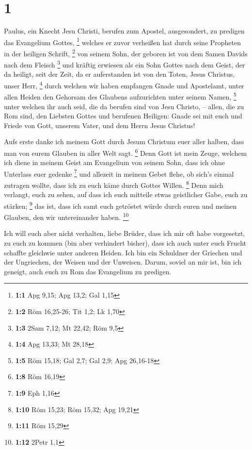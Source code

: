 \hypertarget{section}{%
\section{1}\label{section}}

 Paulus, ein Knecht Jesu Christi, berufen zum Apostel,
ausgesondert, zu predigen das Evangelium Gottes, \footnote{\textbf{1:1}
  Apg 9,15; Apg 13,2; Gal 1,15}  welches er zuvor verheißen
hat durch seine Propheten in der heiligen Schrift, \footnote{\textbf{1:2}
  Röm 16,25-26; Tit 1,2; Lk 1,70}  von seinem Sohn, der
geboren ist von dem Samen Davids nach dem Fleisch \footnote{\textbf{1:3}
  2Sam 7,12; Mt 22,42; Röm 9,5}  und kräftig erwiesen als
ein Sohn Gottes nach dem Geist, der da heiligt, seit der Zeit, da er
auferstanden ist von den Toten, Jesus Christus, unser Herr, \footnote{\textbf{1:4}
  Apg 13,33; Mt 28,18}  durch welchen wir haben empfangen
Gnade und Apostelamt, unter allen Heiden den Gehorsam des Glaubens
aufzurichten unter seinem Namen, \footnote{\textbf{1:5} Röm 15,18; Gal
  2,7; Gal 2,9; Apg 26,16-18}  unter welchen ihr auch seid,
die da berufen sind von Jesu Christo, --  allen, die zu Rom
sind, den Liebsten Gottes und berufenen Heiligen: Gnade sei mit euch und
Friede von Gott, unserem Vater, und dem Herrn Jesus Christus!

 Aufs erste danke ich meinem Gott durch Jesum Christum euer
aller halben, dass man von eurem Glauben in aller Welt sagt. \footnote{\textbf{1:8}
  Röm 16,19}  Denn Gott ist mein Zeuge, welchem ich diene in
meinem Geist am Evangelium von seinem Sohn, dass ich ohne Unterlass euer
gedenke \footnote{\textbf{1:9} Eph 1,16}  und allezeit in
meinem Gebet flehe, ob sich's einmal zutragen wollte, dass ich zu euch
käme durch Gottes Willen. \footnote{\textbf{1:10} Röm 15,23; Röm 15,32;
  Apg 19,21}  Denn mich verlangt, euch zu sehen, auf dass
ich euch mitteile etwas geistlicher Gabe, euch zu stärken; \footnote{\textbf{1:11}
  Röm 15,29}  das ist, dass ich samt euch getröstet würde
durch euren und meinen Glauben, den wir untereinander haben. \footnote{\textbf{1:12}
  2Petr 1,1}

 Ich will euch aber nicht verhalten, liebe Brüder, dass ich
mir oft habe vorgesetzt, zu euch zu kommen (bin aber verhindert bisher),
dass ich auch unter euch Frucht schaffte gleichwie unter anderen Heiden.
 Ich bin ein Schuldner der Griechen und der Ungriechen, der
Weisen und der Unweisen.  Darum, soviel an mir ist, bin ich
geneigt, auch euch zu Rom das Evangelium zu predigen.

